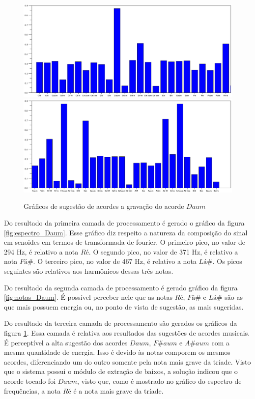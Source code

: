 \begin{figure}[h]
	\centering
		\includegraphics[keepaspectratio=true,scale=0.49]{figuras/Dm/acordes_1_Daum.eps}
		\includegraphics[keepaspectratio=true,scale=0.49]{figuras/Dm/acordes_2_Daum.eps}
	\caption{Gráficos de sugestão de acordes a gravação do acorde $Daum$}
  \label{fig:acordes_Daum}
\end{figure}
\newpage

Do resultado da primeira camada de processamento é gerado o gráfico da figura \ref{fig:espectro_Daum}. Esse gráfico diz respeito a natureza da composição do sinal em senoides em termos de transformada de fourier. O primeiro pico, no valor de 294 Hz, é relativo a nota $Ré$. O segundo pico, no valor de 371 Hz, é relativo a nota $Fá\#$. O terceiro pico, no valor de 467 Hz, é relativo a nota $Lá\#$. Os picos seguintes são relativos aos harmônicos dessas três notas.

Do resultado da segunda camada de processamento é gerado gráfico da figura \ref{fig:notas_Daum}. É possível perceber nele que as notas $Ré$, $Fá\#$ e $Lá\#$ são as que mais possuem energia ou, no ponto de vista de sugestão, as mais sugeridas.

Do resultado da terceira camada de processamento são gerados os gráficos da figura \ref{fig:acordes_Daum}. Essa camada é relativa aos resultados das sugestões de acordes musicais. É perceptível a alta sugestão dos acordes $Daum$, $F\#aum$ e $A\#aum$ com a mesma quantidade de energia. Isso é devido às notas comporem os mesmos acordes, diferenciando um do outro somente pela nota mais grave da tríade. Visto que o sistema possui o módulo de extração de baixos, a solução indicou que o acorde tocado foi $Daum$, visto que, como é mostrado no gráfico do espectro de frequências, a nota $Ré$ é a nota mais grave da tríade.


